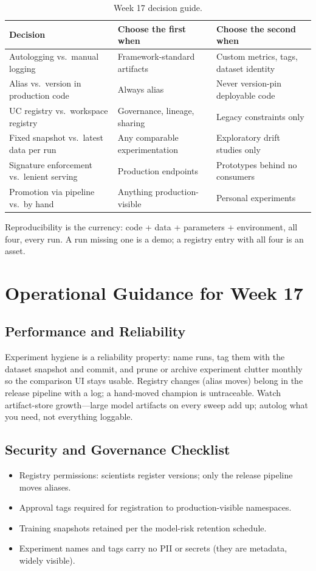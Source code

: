 \begin{table}[H]
\centering
\small
\begin{tabular}{@{}p{3.4cm}p{4.4cm}p{4.6cm}@{}}
\toprule
\textbf{Decision} & \textbf{Choose the first when} & \textbf{Choose the second when} \\
\midrule
Autologging vs.\ manual logging & Framework-standard artifacts & Custom metrics, tags, dataset identity \\
Alias vs.\ version in production code & Always alias & Never version-pin deployable code \\
UC registry vs.\ workspace registry & Governance, lineage, sharing & Legacy constraints only \\
Fixed snapshot vs.\ latest data per run & Any comparable experimentation & Exploratory drift studies only \\
Signature enforcement vs.\ lenient serving & Production endpoints & Prototypes behind no consumers \\
Promotion via pipeline vs.\ by hand & Anything production-visible & Personal experiments \\
\bottomrule
\end{tabular}
\caption{Week 17 decision guide.}
\label{tab:ch17-decisions}
\end{table}

Reproducibility is the currency: code + data + parameters + environment, all four, every run. A run missing one is a demo; a registry entry with all four is an asset.

\section{Operational Guidance for Week 17}
%
\subsection{Performance and Reliability}
Experiment hygiene is a reliability property: name runs, tag them with the dataset snapshot and commit, and prune or archive experiment clutter monthly so the comparison UI stays usable. Registry changes (alias moves) belong in the release pipeline with a log; a hand-moved champion is untraceable. Watch artifact-store growth---large model artifacts on every sweep add up; autolog what you need, not everything loggable.

\subsection{Security and Governance Checklist}
\begin{itemize}
    \item Registry permissions: scientists register versions; only the release pipeline moves aliases.
    \item Approval tags required for registration to production-visible namespaces.
    \item Training snapshots retained per the model-risk retention schedule.
    \item Experiment names and tags carry no PII or secrets (they are metadata, widely visible).
\end{itemize}

